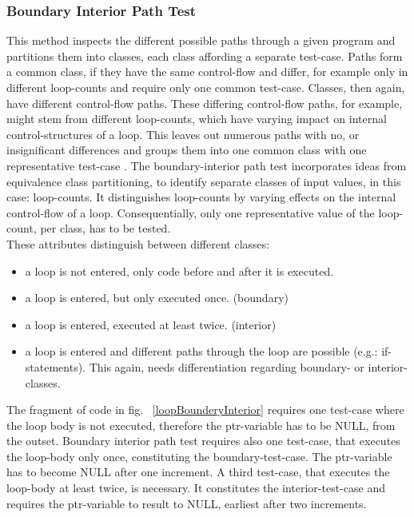 		\subsubsection{Boundary Interior Path Test}
		This method inspects the different possible paths through a given program and partitions them into classes, each class affording a separate test-case. Paths form a common class, if they have the same control-flow and differ, for example only in different loop-counts and require only one common test-case. Classes, then again, have different control-flow paths. These differing control-flow paths, for example, might stem from different loop-counts, which have varying impact on internal control-structures of a loop. This leaves out numerous paths with no, or insignificant differences and groups them into one common class with one representative test-case  \cite{Howden1975MethodologyFT}. The boundary-interior path test incorporates ideas from equivalence class partitioning, to identify separate classes of input values, in this case: loop-counts. It distinguishes loop-counts by varying effects on the internal control-flow of a loop. Consequentially, only one representative value of the loop-count, per class, has to be tested. \\
		These attributes distinguish between different classes:
		\begin{itemize} \setlength\itemsep{1px}
		\item a loop is not entered, only code before and after it is executed.
		\item a loop is entered, but only executed once. (boundary)
		\item a loop is entered, executed at least twice. (interior)
		\item a loop is entered and different paths through the loop are possible (e.g.: if-statements). This again, needs differentiation regarding boundary- or interior- classes.
		\end{itemize}
		
		
		The fragment of code in fig. ~\ref{loopBounderyInterior} requires one test-case where the loop body is not executed, therefore the ptr-variable has to be NULL, from the outset.
		Boundary interior path test requires also one test-case, that executes the loop-body only once, constituting the boundary-test-case. The ptr-variable has to become NULL after one increment.
		A third test-case, that executes the loop-body at least twice, is necessary. It constitutes the interior-test-case and requires the ptr-variable to result to NULL, earliest after two increments.
		
